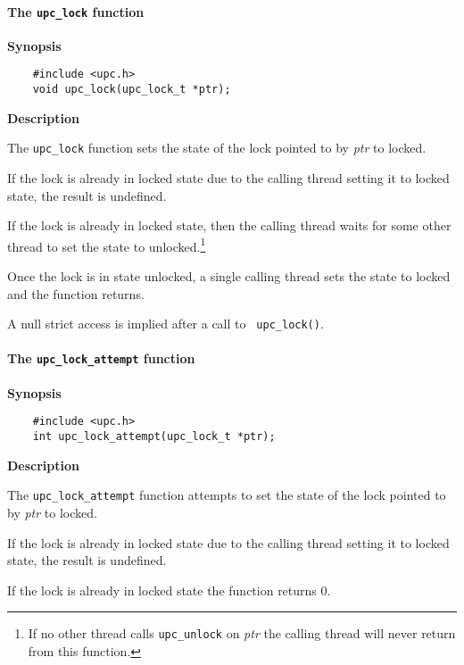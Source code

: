 \cbend

\paragraph{The {\tt upc\_lock} function}

{\bf Synopsis} 

\npf\vspace{-2.5em}
\begin{verbatim}
    #include <upc.h> 
    void upc_lock(upc_lock_t *ptr); 
\end{verbatim}

{\bf Description}

\np The {\tt upc\_lock} function sets the state of the lock
    pointed to by {\em ptr} to locked.

\np If the lock is already in locked state due to the calling thread setting it
    to locked state, the result is undefined.

\np If the lock is already in locked state, then the calling
    thread waits for some other thread to set the state to 
    unlocked.\footnote{If no other thread calls {\tt upc\_unlock} on {\em ptr}
    the calling thread will never return from this function.}

\np Once the lock is in state unlocked, a single calling thread
    sets the state to locked and the function returns.

\np A null strict access is implied after a call to {\tt
    upc\_lock()}.

\paragraph{The {\tt upc\_lock\_attempt} function}

{\bf Synopsis} 

\npf\vspace{-2.5em}
\begin{verbatim}
    #include <upc.h> 
    int upc_lock_attempt(upc_lock_t *ptr); 
\end{verbatim}

{\bf Description}

\np The {\tt upc\_lock\_attempt} function attempts to set the state of
   the lock pointed to by {\em ptr} to locked.

\np If the lock is already in locked state due to the calling thread setting it
    to locked state, the result is undefined.

\np If the lock is already in locked state the function returns 0.
    
